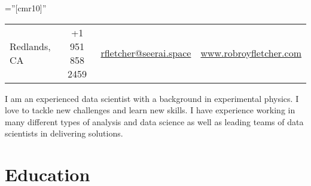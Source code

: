 \documentclass[a4paper,10pt]{article} %
\begin{document}
\pagestyle{empty} %

\font\fb=''[cmr10]'' %


\par{\bigskip\par} %
\begin{centering}
\begin{tabular}{ l | c | c | r}
Redlands, CA   &  +1 951 858 2459   &   \href{mailto:rfletcher@seerai.space}{rfletcher@seerai.space} & \href{www.robroyfletcher.com}{www.robroyfletcher.com}
\end{tabular} \par
\end{centering}

\vspace{5mm}
I am an experienced data scientist with a background in experimental physics. I love to tackle new challenges and learn new 
skills. I have experience working in many different types of analysis and data science as well as leading teams of data 
scientists in delivering solutions.
\vspace{3mm}





\section{Education}
\end{document}
